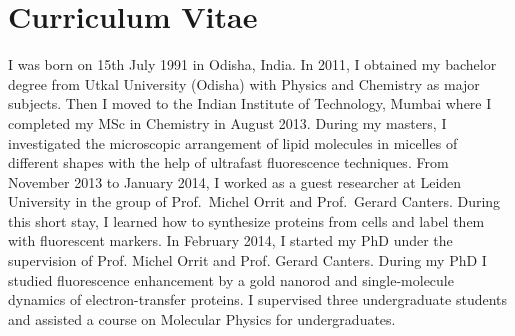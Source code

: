 \chapter*{Curriculum Vitae}
\label{ch:CV}

I was born on 15th July 1991 in Odisha, India.
In 2011, I obtained my bachelor degree from Utkal University (Odisha) with Physics and Chemistry as major subjects.
Then I moved to the Indian Institute of Technology, Mumbai where I completed my MSc in Chemistry in August 2013.
During my masters, I investigated the microscopic arrangement of lipid molecules in micelles of different shapes with the help of ultrafast fluorescence techniques.
From November 2013 to January 2014, I worked as a guest researcher at Leiden University in the group of Prof.~Michel Orrit and Prof.~Gerard Canters.
During this short stay, I learned how to synthesize proteins from cells and label them with fluorescent markers.
In February 2014, I started my PhD under the supervision of Prof. Michel Orrit and Prof. Gerard Canters.
During my PhD I studied fluorescence enhancement by a gold nanorod and single-molecule dynamics of electron-transfer proteins.
I supervised three undergraduate students and assisted a course on Molecular Physics for undergraduates.


